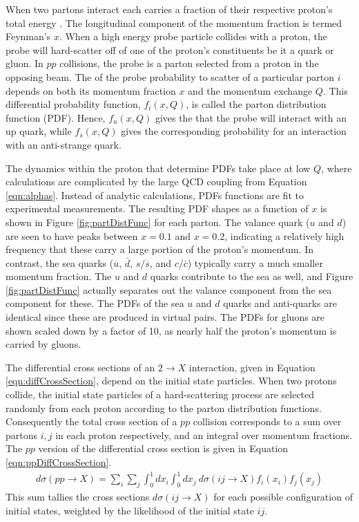 When two partons interact each carries a fraction of their respective proton's total energy \sqrts.
The longitudinal component of the momentum fraction is termed Feynman's $x$.
When a high energy probe particle collides with a proton, the probe will hard-scatter off of one of the proton's constituents be it a quark or gluon.
In $pp$ collisions, the probe is a parton selected from a proton in the opposing beam.
The of the probe probability to scatter of a particular parton $i$ depends on both its momentum fraction $x$ and the momentum exchange $Q$.
This differential probability function, $f_i(x,Q)$, is called the parton distribution function (PDF).
Hence, $f_u(x,Q)$ gives the that the probe will interact with an up quark, while $f_{\overline{s}}(x,Q)$ gives the corresponding probability for an interaction with an anti-strange quark.

The dynamics within the proton that determine PDFs take place at low $Q$, where calculations are complicated by the large QCD coupling from Equation \ref{eqn:alphas}.
Instead of analytic calculations, PDFs functions are fit to experimental measurements.
The resulting PDF shapes as a function of $x$ is shown in Figure \ref{fig:partDistFunc} for each parton.
The valance quark ($u$ and $d$) are seen to have peaks between $x=0.1$ and $x=0.2$, indicating a relatively high frequency that these carry a large portion of the proton's momentum.
In contrast, the sea quarks ($\overline{u}$, $\overline{d}$, $s/\overline{s}$, and $c/\overline{c}$) typically carry a much smaller momentum fraction.
The $u$ and $d$ quarks contribute to the sea as well, and Figure \ref{fig:partDistFunc} actually separates out the valance component from the sea component for these.
The PDFs of the sea $u$ and $d$ quarks and anti-quarks are identical since these are produced in virtual pairs.
The PDFs for gluons are shown scaled down by a factor of 10, as nearly half the proton's momentum is carried by gluons.\cite{wells}

The differential cross sections of an $2\to X$ interaction, given in Equation \ref{eqn:diffCrossSection}, depend on the initial state particles.
When two protons collide, the initial state particles of a hard-scattering process are selected randomly from each proton according to the parton distribution functions.
Consequently the total cross section of a $pp$ collision corresponds to a sum over partons $i,j$ in each proton respectively, and an integral over momentum fractions.
The $pp$ version of the differential cross section is given in Equation \ref{eqn:ppDiffCrossSection}.
\begin{equation}\begin{split}\label{eqn:ppDiffCrossSection}
d\sigma(pp\to X)=\sum_i\sum_j\int_0^1dx_i\int_0^1dx_j~d\sigma(ij\to X)f_i(x_i)f_j(x_j)
\end{split}\end{equation} 
This sum tallies the cross sections $d\sigma(ij\to X)$ for each possible configuration of initial states, weighted by the likelihood of the initial state $ij$.

